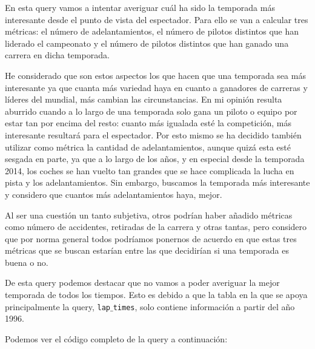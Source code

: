 \documentclass[12pt,twoside,titlepage]{report}
\begin{document}
En esta query vamos a intentar averiguar cuál ha sido la temporada más interesante desde el punto de vista del espectador. Para ello se van a calcular tres métricas: el número de adelantamientos, el número de pilotos distintos que han liderado el campeonato y el número de pilotos distintos que han ganado una carrera en dicha temporada.

He considerado que son estos aspectos los que hacen que una temporada sea más interesante ya que cuanta más variedad haya en cuanto a ganadores de carreras y líderes del mundial, más cambian las circunstancias. En mi opinión resulta aburrido cuando a lo largo de una temporada solo gana un piloto o equipo por estar tan por encima del resto: cuanto más igualada esté la competición, más interesante resultará para el espectador. Por esto mismo se ha decidido también utilizar como métrica la cantidad de adelantamientos, aunque quizá esta esté sesgada en parte, ya que a lo largo de los años, y en especial desde la temporada 2014, los coches se han vuelto tan grandes que se hace complicada la lucha en pista y los adelantamientos. Sin embargo, buscamos la temporada más interesante y considero que cuantos más adelantamientos haya, mejor.

Al ser una cuestión un tanto subjetiva, otros podrían haber añadido métricas como número de accidentes, retiradas de la carrera y otras tantas, pero considero que por norma general todos podríamos ponernos de acuerdo en que estas tres métricas que se buscan estarían entre las que decidirían si una temporada es buena o no.

De esta query podemos destacar que no vamos a poder averiguar la mejor temporada de todos los tiempos. Esto es debido a que la tabla en la que se apoya principalmente la query, \texttt{lap$\_$times}, solo contiene información a partir del año 1996.


Podemos ver el código completo de la query a continuación:
\end{document}
